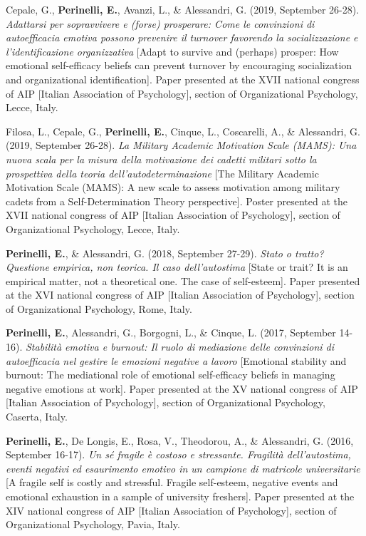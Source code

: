 \documentclass[hidelinks, letterpaper,10pt]{article} %
\begin{document}
\begin{etaremune}
    \item Cepale, G., \textbf{Perinelli, E.}, Avanzi, L., \& Alessandri, G. (2019, September 26-28). \textit{Adattarsi per sopravvivere e (forse) prosperare: Come le convinzioni di autoefficacia emotiva possono prevenire il turnover favorendo la socializzazione e l’identificazione organizzativa} [Adapt to survive and (perhaps) prosper: How emotional self-efficacy beliefs can prevent turnover by encouraging socialization and organizational identification]. Paper presented at the XVII national congress of AIP [Italian Association of Psychology], section of Organizational Psychology, Lecce, Italy.

    \item Filosa, L., Cepale, G., \textbf{Perinelli, E.}, Cinque, L., Coscarelli, A., \& Alessandri, G. (2019, September 26-28). \textit{La Military Academic Motivation Scale (MAMS): Una nuova scala per la misura della motivazione dei cadetti militari sotto la prospettiva della teoria dell’autodeterminazione} [The Military Academic Motivation Scale (MAMS): A new scale to assess motivation among military cadets from a Self-Determination Theory perspective]. Poster presented at the XVII national congress of AIP [Italian Association of Psychology], section of Organizational Psychology, Lecce, Italy.

    \item \textbf{Perinelli, E.}, \& Alessandri, G. (2018, September 27-29). \textit{Stato o tratto? Questione empirica, non teorica. Il caso dell’autostima} [State or trait? It is an empirical matter, not a theoretical one. The case of self-esteem]. Paper presented at the XVI national congress of AIP [Italian Association of Psychology], section of Organizational Psychology, Rome, Italy.

    \item \textbf{Perinelli, E.}, Alessandri, G., Borgogni, L., \& Cinque, L. (2017, September 14-16). \textit{Stabilità emotiva e burnout: Il ruolo di mediazione delle convinzioni di autoefficacia nel gestire le emozioni negative a lavoro} [Emotional stability and burnout: The mediational role of emotional self-efficacy beliefs in managing negative emotions at work]. Paper presented at the XV national congress of AIP [Italian Association of Psychology], section of Organizational Psychology, Caserta, Italy.

    \item \textbf{Perinelli, E.}, De Longis, E., Rosa, V., Theodorou, A., \& Alessandri, G. (2016, September 16-17). \textit{Un sé fragile è costoso e stressante. Fragilità dell’autostima, eventi negativi ed esaurimento emotivo in un campione di matricole universitarie} [A fragile self is costly and stressful. Fragile self-esteem, negative events and emotional exhaustion in a sample of university freshers]. Paper presented at the XIV national congress of AIP [Italian Association of Psychology], section of Organizational Psychology, Pavia, Italy.
\end{etaremune}
\end{document}
